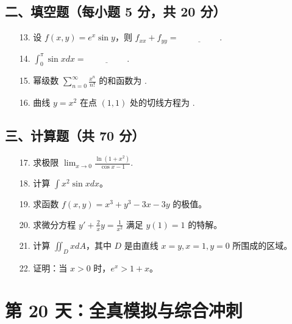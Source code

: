 \documentclass[11pt,a4paper]{article}
\begin{document}
\subsection*{二、填空题（每小题 5 分，共 20 分）}
\begin{enumerate}
    \item[13.] 设 $f(x,y) = e^x \sin y$，则 $f_{xx} + f_{yy} = \underline{\hspace{2cm}}$.
    \item[14.] $\int_0^{\pi} \sin x dx = \underline{\hspace{2cm}}$.
    \item[15.] 幂级数 $\sum_{n=0}^{\infty} \frac{x^n}{n!}$ 的和函数为 \underline{\hspace{2cm}}.
    \item[16.] 曲线 $y = x^2$ 在点 $(1,1)$ 处的切线方程为 \underline{\hspace{2cm}}.
\end{enumerate}
\subsection*{三、计算题（共 70 分）}
\begin{enumerate}
    \item[17.] 求极限 $\lim_{x \to 0} \frac{\ln(1+x^2)}{\cos x - 1}$.
    \item[18.] 计算 $\int x^2 \sin x dx$。
    \item[19.] 求函数 $f(x,y) = x^3 + y^3 - 3x - 3y$ 的极值。
    \item[20.] 求微分方程 $y' + \frac{2}{x}y = \frac{1}{x^2}$ 满足 $y(1)=1$ 的特解。
    \item[21.] 计算 $\iint_D x dA$，其中 $D$ 是由直线 $x=y, x=1, y=0$ 所围成的区域。
    \item[22.] 证明：当 $x > 0$ 时，$e^x > 1 + x$。
\end{enumerate}

\newpage

\section*{第 20 天：全真模拟与综合冲刺}
\end{document}
